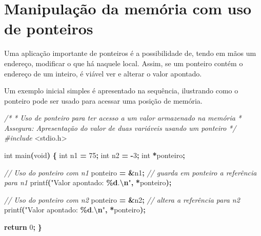 \documentclass[
  11pt,
  a4paper,
]{scrbook}
\newenvironment{Shaded}{\begin{snugshade}}{\end{snugshade}}
\newcommand{\CommentTok}[1]{\textcolor[rgb]{0.56,0.35,0.01}{\textit{#1}}}
\newcommand{\ControlFlowTok}[1]{\textcolor[rgb]{0.13,0.29,0.53}{\textbf{#1}}}
\newcommand{\DataTypeTok}[1]{\textcolor[rgb]{0.13,0.29,0.53}{#1}}
\newcommand{\DecValTok}[1]{\textcolor[rgb]{0.00,0.00,0.81}{#1}}
\newcommand{\ImportTok}[1]{#1}
\newcommand{\NormalTok}[1]{#1}
\newcommand{\OperatorTok}[1]{\textcolor[rgb]{0.81,0.36,0.00}{\textbf{#1}}}
\newcommand{\PreprocessorTok}[1]{\textcolor[rgb]{0.56,0.35,0.01}{\textit{#1}}}
\newcommand{\SpecialCharTok}[1]{\textcolor[rgb]{0.81,0.36,0.00}{\textbf{#1}}}
\newcommand{\StringTok}[1]{\textcolor[rgb]{0.31,0.60,0.02}{#1}}
\begin{document}
\section{Manipulação da memória com uso de
ponteiros}\label{manipulauxe7uxe3o-da-memuxf3ria-com-uso-de-ponteiros}

Uma aplicação importante de ponteiros é a possibilidade de, tendo em
mãos um endereço, modificar o que há naquele local. Assim, se um
ponteiro contém o endereço de um inteiro, é viável ver e alterar o valor
apontado.

Um exemplo inicial simples é apresentado na sequência, ilustrando como o
ponteiro pode ser usado para acessar uma posição de memória.

\begin{Shaded}
\begin{Highlighting}[]
\CommentTok{/*}
\CommentTok{ * Uso de ponteiro para ter acesso a um valor armazenado na memória}
\CommentTok{ * Assegura: Apresentação do valor de duas variáveis usando um ponteiro}
\CommentTok{ */}
\PreprocessorTok{\#include }\ImportTok{\textless{}stdio.h\textgreater{}}

\DataTypeTok{int}\NormalTok{ main}\OperatorTok{(}\DataTypeTok{void}\OperatorTok{)} \OperatorTok{\{}
    \DataTypeTok{int}\NormalTok{ n1 }\OperatorTok{=} \DecValTok{75}\OperatorTok{;}
    \DataTypeTok{int}\NormalTok{ n2 }\OperatorTok{=} \OperatorTok{{-}}\DecValTok{3}\OperatorTok{;}
    \DataTypeTok{int} \OperatorTok{*}\NormalTok{ponteiro}\OperatorTok{;}

    \CommentTok{// Uso do ponteiro com n1}
\NormalTok{    ponteiro }\OperatorTok{=} \OperatorTok{\&}\NormalTok{n1}\OperatorTok{;}  \CommentTok{// guarda em ponteiro a referência para n1}
\NormalTok{    printf}\OperatorTok{(}\StringTok{"Valor apontado: }\SpecialCharTok{\%d}\StringTok{.}\SpecialCharTok{\textbackslash{}n}\StringTok{"}\OperatorTok{,} \OperatorTok{*}\NormalTok{ponteiro}\OperatorTok{);}

    \CommentTok{// Uso do ponteiro com n2}
\NormalTok{    ponteiro }\OperatorTok{=} \OperatorTok{\&}\NormalTok{n2}\OperatorTok{;}  \CommentTok{// altera a referência para n2}
\NormalTok{    printf}\OperatorTok{(}\StringTok{"Valor apontado: }\SpecialCharTok{\%d}\StringTok{.}\SpecialCharTok{\textbackslash{}n}\StringTok{"}\OperatorTok{,} \OperatorTok{*}\NormalTok{ponteiro}\OperatorTok{);}

    \ControlFlowTok{return} \DecValTok{0}\OperatorTok{;}
\OperatorTok{\}}
\end{Highlighting}
\end{Shaded}
\end{document}
